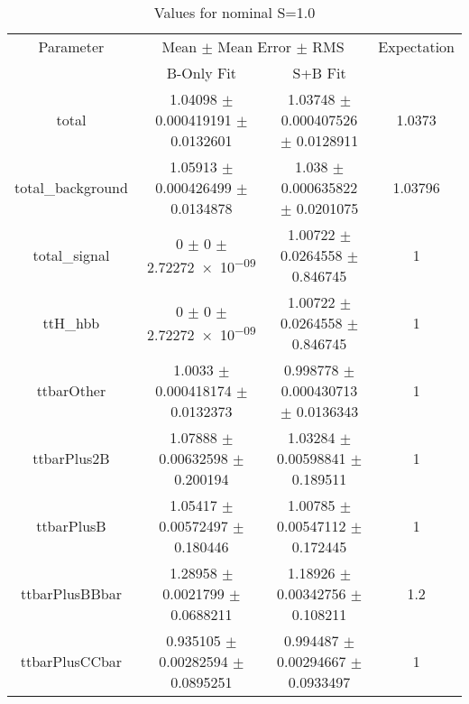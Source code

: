 \begin{table}
\centering
\caption{Values for nominal S=1.0}
\begin{tabular}{cccc}
\toprule
Parameter & \multicolumn{2}{c}{Mean $\pm$ Mean Error $\pm$ RMS} & Expectation\\
 & B-Only Fit & S+B Fit & \\
\midrule
total & \num{1.04098} $\pm$ \num{0.000419191} $\pm$ \num{0.0132601} & \num{1.03748} $\pm$ \num{0.000407526} $\pm$ \num{0.0128911} & \num{1.0373}\\
total\_background & \num{1.05913} $\pm$ \num{0.000426499} $\pm$ \num{0.0134878} & \num{1.038} $\pm$ \num{0.000635822} $\pm$ \num{0.0201075} & \num{1.03796}\\
total\_signal & \num{0} $\pm$ \num{0} $\pm$ \num{2.72272e-09} & \num{1.00722} $\pm$ \num{0.0264558} $\pm$ \num{0.846745} & \num{1}\\
ttH\_hbb & \num{0} $\pm$ \num{0} $\pm$ \num{2.72272e-09} & \num{1.00722} $\pm$ \num{0.0264558} $\pm$ \num{0.846745} & \num{1}\\
ttbarOther & \num{1.0033} $\pm$ \num{0.000418174} $\pm$ \num{0.0132373} & \num{0.998778} $\pm$ \num{0.000430713} $\pm$ \num{0.0136343} & \num{1}\\
ttbarPlus2B & \num{1.07888} $\pm$ \num{0.00632598} $\pm$ \num{0.200194} & \num{1.03284} $\pm$ \num{0.00598841} $\pm$ \num{0.189511} & \num{1}\\
ttbarPlusB & \num{1.05417} $\pm$ \num{0.00572497} $\pm$ \num{0.180446} & \num{1.00785} $\pm$ \num{0.00547112} $\pm$ \num{0.172445} & \num{1}\\
ttbarPlusBBbar & \num{1.28958} $\pm$ \num{0.0021799} $\pm$ \num{0.0688211} & \num{1.18926} $\pm$ \num{0.00342756} $\pm$ \num{0.108211} & \num{1.2}\\
ttbarPlusCCbar & \num{0.935105} $\pm$ \num{0.00282594} $\pm$ \num{0.0895251} & \num{0.994487} $\pm$ \num{0.00294667} $\pm$ \num{0.0933497} & \num{1}\\
\bottomrule
\end{tabular}
\end{table}